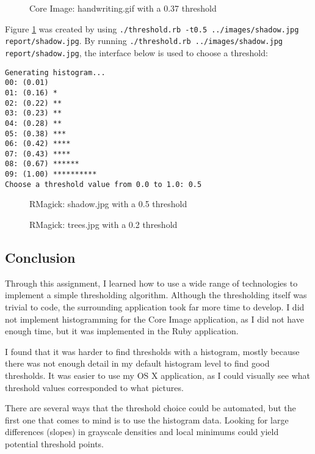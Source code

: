 \documentclass[11pt]{article}
\begin{document}
\begin{figure}[h]
\centering
{}
\caption{Core Image: handwriting.gif with a 0.37 threshold}
\end{figure}

Figure \ref{shadow} was created by using \verb|./threshold.rb -t0.5 ../images/shadow.jpg report/shadow.jpg|. By running \verb|./threshold.rb ../images/shadow.jpg report/shadow.jpg|, the interface below is used to choose a threshold:

\newpage
\begin{verbatim}
Generating histogram...
00: (0.01) 
01: (0.16) *
02: (0.22) **
03: (0.23) **
04: (0.28) **
05: (0.38) ***
06: (0.42) ****
07: (0.43) ****
08: (0.67) ******
09: (1.00) **********
Choose a threshold value from 0.0 to 1.0: 0.5
\end{verbatim}

\begin{figure}[h]
\centering
{}
\caption{RMagick: shadow.jpg with a 0.5 threshold}
\label{shadow}
\end{figure}

\begin{figure}[h]
\centering
{}
\caption{RMagick: trees.jpg with a 0.2 threshold}
\end{figure}

\subsection{Conclusion}

Through this assignment, I learned how to use a wide range of technologies to implement a simple thresholding algorithm. Although the thresholding itself was trivial to code, the surrounding application took far more time to develop. I did not implement histogramming for the Core Image application, as I did not have enough time, but it was implemented in the Ruby application.

I found that it was harder to find thresholds with a histogram, mostly because there was not enough detail in my default histogram level to find good thresholds. It was easier to use my OS X application, as I could visually see what threshold values corresponded to what pictures.

There are several ways that the threshold choice could be automated, but the first one that comes to mind is to use the histogram data. Looking for large differences (slopes) in grayscale densities and local minimums could yield potential threshold points.
\end{document}
